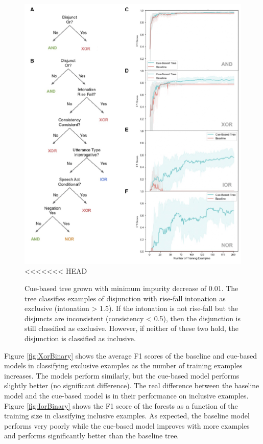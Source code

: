 \documentclass[,man,floatsintext]{apa6}
\begin{document}
\begin{figure}
\centering
\includegraphics{figs/binaryCueBased-1.pdf}
<<<<<<< HEAD
\caption{\label{fig:binaryCueBased}Cue-based tree grown with minimum impurity decrease of 0.01. The tree classifies examples of disjunction with rise-fall intonation as exclusive (intonation \textgreater{} 1.5). If the intonation is not rise-fall but the disjuncts are inconsistent (consistency \textless{} 0.5), then the disjunction is still classified as exclusive. However, if neither of these two hold, the disjunction is classified as inclusive.}
\end{figure}

Figure \ref{fig:XorBinary} shows the average F1 scores of the baseline and cue-based models in classifying exclusive examples as the number of training examples increases. The models perform similarly, but the cue-based model performs slightly better (no significant difference). The real difference between the baseline model and the cue-based model is in their performance on inclusive examples. Figure \ref{fig:IorBinary} shows the F1 score of the forests as a function of the training size in classifying inclusive examples. As expected, the baseline model performs very poorly while the cue-based model improves with more examples and performs significantly better than the baseline tree.
\end{document}
